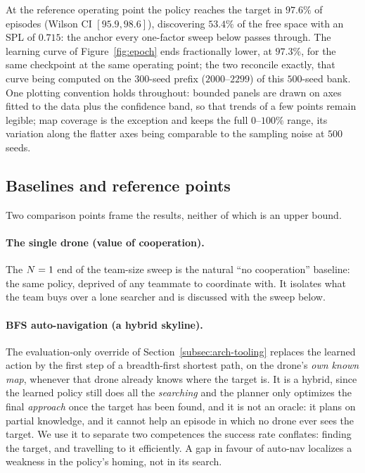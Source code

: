 At the reference operating point the policy reaches the target in $97.6\%$ of
episodes (Wilson CI $[95.9, 98.6]$), discovering $53.4\%$ of the free space with
an SPL of $0.715$: the anchor every one-factor sweep below passes through. The
learning curve of Figure~\ref{fig:epoch} ends fractionally lower, at $97.3\%$, for
the same checkpoint at the same operating point; the two reconcile exactly, that
curve being computed on the $300$-seed prefix ($2000$--$2299$) of this $500$-seed
bank. One
plotting convention holds throughout: bounded panels are drawn on axes fitted to
the data plus the confidence band, so that trends of a few points remain legible;
map coverage is the exception and keeps the full $0\text{--}100\%$ range, its
variation along the flatter axes being comparable to the sampling noise at $500$
seeds.

\subsection{Baselines and reference points}
\label{subsec:exp-baselines}

Two comparison points frame the results, neither of which is an upper bound.

\paragraph{The single drone (value of cooperation).}
The $N = 1$ end of the team-size sweep is the natural ``no cooperation''
baseline: the same policy, deprived of any teammate to coordinate with. It
isolates what the team buys over a lone searcher and is discussed with the sweep
below.

\paragraph{BFS auto-navigation (a hybrid skyline).}
The evaluation-only override of Section~\ref{subsec:arch-tooling} replaces the
learned action by the first step of a breadth-first shortest path, on the drone's
\emph{own known map}, whenever that drone already knows where the target is. It
is a hybrid, since the learned policy still does all the \emph{searching} and the
planner only optimizes the final \emph{approach} once the target has been found,
and it is not an oracle: it plans on partial knowledge, and it cannot help an
episode in which no drone ever sees the target. We use it to separate two
competences the success rate conflates: finding the target, and travelling to it
efficiently. A gap in favour of auto-nav localizes a weakness in the policy's
homing, not in its search.

